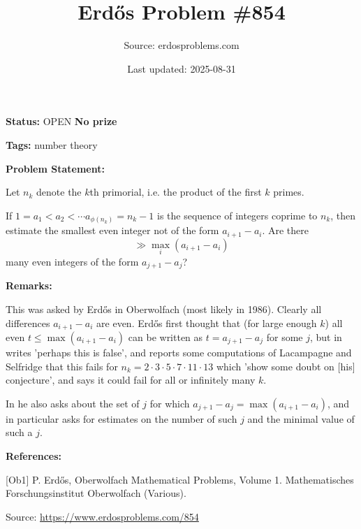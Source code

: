 \documentclass{article}
\title{Erd\H{o}s Problem \#854}
\date{Last updated: 2025-08-31}
\author{Source: erdosproblems.com}
\begin{document}
\maketitle

\noindent\textbf{Status:} OPEN \quad \textbf{No prize}

\noindent\textbf{Tags:} number theory

\medskip
\noindent\textbf{Problem Statement:}

Let $n_k$ denote the $k$th primorial, i.e. the product of the first $k$ primes.

If $1=a_1<a_2<\cdots a_{\phi(n_k)}=n_k-1$ is the sequence of integers coprime to $n_k$, then estimate the smallest even integer not of the form $a_{i+1}-a_i$. Are there\[\gg \max_i (a_{i+1}-a_i)\]many even integers of the form $a_{j+1}-a_j$?

\bigskip
\noindent\textbf{Remarks:}

This was asked by Erd\H{o}s in Oberwolfach (most likely in 1986). Clearly all differences $a_{i+1}-a_i$ are even. Erd\H{o}s first thought that (for large enough $k$) all even $t\leq \max(a_{i+1}-a_i)$ can be written as $t=a_{j+1}-a_j$ for some $j$, but in \cite{Ob1} writes 'perhaps this is false', and reports some computations of Lacampagne and Selfridge that this fails for $n_k=2\cdot 3\cdot 5\cdot 7\cdot 11\cdot 13$ which 'show some doubt on [his] conjecture', and says it could fail for all or infinitely many $k$.

In \cite{Ob1} he also asks about the set of $j$ for which $a_{j+1}-a_j=\max(a_{i+1}-a_i)$, and in particular asks for estimates on the number of such $j$ and the minimal value of such a $j$.

\bigskip
\noindent\textbf{References:}

[Ob1] P. Erd\H{o}s, Oberwolfach Mathematical Problems, Volume 1. Mathematisches Forschungsinstitut Oberwolfach (Various).

\bigskip
\noindent\small{Source: \url{https://www.erdosproblems.com/854}}
\end{document}
